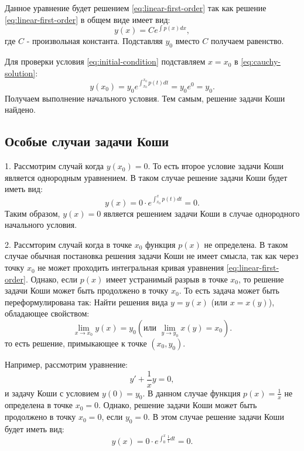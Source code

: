\documentclass[12pt]{article}
\begin{document}
Данное уравнение будет решением \eqref{eq:linear-first-order}
так как решение \eqref{eq:linear-first-order} в общем виде имеет вид:
\begin{equation}\label{eq:general-solution}
    y(x) = Ce^{\int p(x) dx},
\end{equation}
где $C$ - произвольная константа. Подставляя $y_0$ вместо $C$ получаем
равенство.

Для проверки условия \eqref{eq:initial-condition} подставляем $x = x_0$ в \eqref{eq:cauchy-solution}:
\begin{equation*}
    y(x_0) = y_0 e^{\int_{x_0}^{x_0} p(t) dt} = y_0 e^0 = y_0.
\end{equation*}
Получаем выполнение начального условия. Тем самым, решение задачи Коши
найдено.

\subsection{Особые случаи задачи Коши}
1. Рассмотрим случай когда $y(x_0) = 0$. То есть второе условие задачи Коши
является однородным уравнением. В таком случае решение задачи Коши
будет иметь вид:
\begin{equation*}
    y(x) = 0 \cdot e^{\int_{x_0}^{x} p(t) dt} = 0.
\end{equation*}
Таким образом, $y(x) = 0$ является решением задачи Коши
в случае однородного начального условия.

2. Рассмторим случай когда в точке $x_0$ функция $p(x)$ не определена.
В таком случае обычная постановка решения задачи Коши не имеет смысла,
так как через точку $x_0$ не может проходить интегральная кривая
уравнения \eqref{eq:linear-first-order}. Однако, если $p(x)$ имеет
устранимый разрыв в точке $x_0$, то решение
задачи Коши может быть продолжено в точку $x_0$. То есть задача может быть
переформулирована так: Найти решения вида $y = y(x)$ (или $x = x(y)$), обладающее свойством:
\begin{equation*}
    \lim_{x \to x_0} y(x) = y_0 (\text{или } \lim_{y \to y_0} x(y) = x_0).
\end{equation*}
то есть решение, примыкающее к точке $(x_0, y_0)$.

Например, рассмотрим
уравнение:
\begin{equation*}
    y' + \frac{1}{x}y = 0,
\end{equation*}
и задачу Коши с условием $y(0) = y_0$. В данном случае функция
$p(x) = \frac{1}{x}$ не определена в точке $x_0 = 0$. Однако,
решение задачи Коши может быть продолжено в точку $x_0 = 0$,
если $y_0 = 0$. В этом случае решение задачи Коши будет иметь вид:
\begin{equation*}
    y(x) = 0 \cdot e^{\int_{0}^{x} \frac{1}{t} dt} = 0.
\end{equation*}
\end{document}

